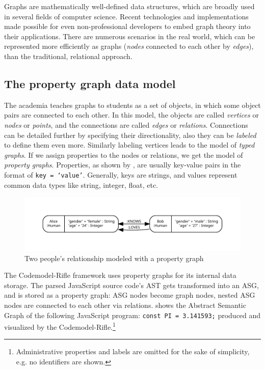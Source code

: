 Graphs are mathematically well-defined data structures, which are broadly used in several fields of computer science. Recent technologies and implementations made possible for even non-professional developers to embed graph theory into their applications. There are numerous scenarios in the real world, which can be represented more efficiently as graphs (\emph{nodes} connected to each other by \emph{edges}), than the traditional, relational approach.

\subsection{The property graph data model}

The academia teaches graphs to students as a set of objects, in which some object pairs are connected to each other. In this model, the objects are called \emph{vertices} or \emph{nodes} or \emph{points}, and the connections are called \emph{edges} or \emph{relations}. Connections can be detailed further by specifying their directionality, also they can be \emph{labeled} to define them even more. Similarly labeling vertices leads to the model of \emph{typed graphs}. If we assign properties to the nodes or relations, we get the model of \emph{property graphs}. Properties, as shown by , are usually key-value pairs in the format of \texttt{key = `value'}. Generally, keys are strings, and values represent common data types like string, integer, float, etc.

\begin{figure}[!htb]
	\centering
	\includegraphics[width=\textwidth, trim=1cm 1cm 1cm 1cm,clip]{figures/property-graph.pdf}
	\caption{Two people's relationship modeled with a property graph}
	\label{fig:property-graph}
\end{figure}

The Codemodel-Rifle framework uses property graphs for its internal data storage. The parsed JavaScript source code's AST gets transformed into an ASG, and is stored as a property graph: ASG nodes become graph nodes, nested ASG nodes are connected to each other via relations.  shows the Abstract Semantic Graph of the following JavaScript program: \texttt{const PI = 3.141593;} produced and visualized by the Codemodel-Rifle.\footnote{Administrative properties and labels are omitted for the sake of simplicity, e.g. no identifiers are shown.}


